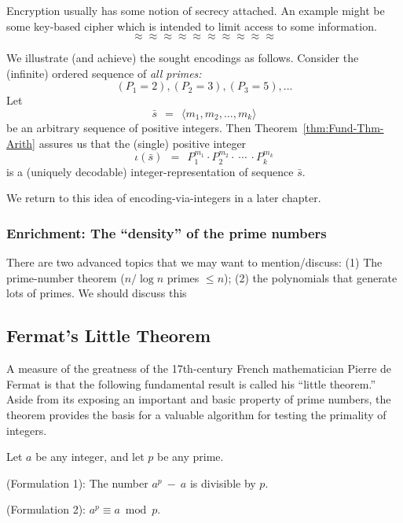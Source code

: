 Encryption usually has some notion of secrecy attached.  An example
might be some key-based cipher which is intended to limit access to
some information.
\[ \approx \approx \approx \approx \approx \approx \approx \approx \approx \approx \]

We illustrate (and achieve) the sought encodings as follows.  Consider
the (infinite) ordered sequence of {\em all primes:}
\[ (P_1 = 2), (P_2 = 3), (P_3 = 5), \ldots  \]
Let
\begin{equation}
\label{eq:sequence-vec-s}
\bar{s} \ \ = \ \ \langle m_1, m_2, \ldots, m_k \rangle
\end{equation}
be an arbitrary sequence of positive integers.  Then
Theorem~\ref{thm:Fund-Thm-Arith} assures us that the (single) positive
integer
\[ 
\iota(\bar{s}) \ \ = \ \ P_1^{m_1} \cdot P_2^{m_2} \cdot \ \cdots \
\cdot P_k^{m_k}
\]
is a (uniquely decodable) integer-representation of sequence $\bar{s}$.

We return to this idea of encoding-via-integers in a later chapter.

\subsubsection{Enrichment: The ``density'' of the prime numbers}
\label{sec:prime-density}

{\Arny There are two advanced topics that we may want to
  mention/discuss: (1) The prime-number theorem ($n/ \log n$ primes
  $\leq n$); (2) the polynomials that generate lots of primes.  We
  should discuss this}
  

\subsection{Fermat's Little Theorem}
\label{sec:fermat}

A measure of the greatness of the 17th-century French mathematician
Pierre de Fermat \index{Fermat, Pierre de} is that the following
fundamental result is called his ``little theorem.''  Aside from its
exposing an important and basic property of prime numbers, the theorem
provides the basis for a valuable algorithm for testing the primality
of integers.


\begin{theorem}
\label{thm:Fermat's-Little-Thm}

Let $a$ be any integer, and let $p$ be any prime.

{\rm (Formulation 1):}
The number $a^p \ − \ a$ is divisible by $p$.

\medskip

{\rm (Formulation 2):}
$a^{p} \equiv a \bmod p$.
\end{theorem}


